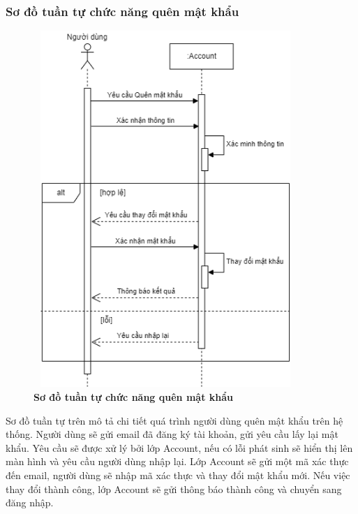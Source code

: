 \subsubsection{Sơ đồ tuần tự chức năng quên mật khẩu}
\begin{figure}[H]
  \centering
  \includegraphics[width=10cm,height=13.5cm]{Images/sequence/sequence_forgot_password.png}
  \caption[Sơ đồ tuần tự chức năng quên mật khẩu]{\bfseries \fontsize{12pt}{0pt}
  \selectfont Sơ đồ tuần tự chức năng quên mật khẩu}
  \label{sequence_forgot_pass} %
\end{figure}
Sơ đồ tuần tự trên mô tả chi tiết quá trình người dùng quên mật khẩu trên hệ thống. Người dùng sẽ gửi email đã đăng ký tài khoản, gửi yêu cầu
lấy lại mật khẩu. Yêu cầu sẽ được xử lý bởi lớp Account, nếu có lỗi phát sinh sẽ hiển thị lên màn hình và yêu cầu người dùng nhập lại. Lớp Account sẽ gửi một mã xác thực
đến email, người dùng sẽ nhập mã xác thực và thay đổi mật khẩu mới. Nếu việc thay đổi thành công, lớp Account sẽ gửi thông báo thành công và chuyển sang đăng nhập.

